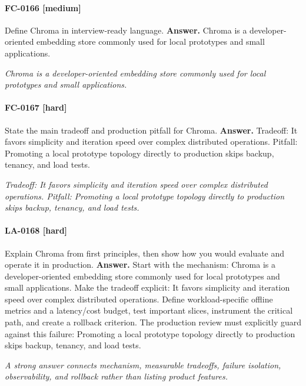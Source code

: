 \paragraph{FC-0166 [medium]} Define Chroma in interview-ready language.
\noindent\textbf{Answer.} Chroma is a developer-oriented embedding store commonly used for local prototypes and small applications.
\par\textit{Chroma is a developer-oriented embedding store commonly used for local prototypes and small applications.}
\paragraph{FC-0167 [hard]} State the main tradeoff and production pitfall for Chroma.
\noindent\textbf{Answer.} Tradeoff: It favors simplicity and iteration speed over complex distributed operations. Pitfall: Promoting a local prototype topology directly to production skips backup, tenancy, and load tests.
\par\textit{Tradeoff: It favors simplicity and iteration speed over complex distributed operations. Pitfall: Promoting a local prototype topology directly to production skips backup, tenancy, and load tests.}
\paragraph{LA-0168 [hard]} Explain Chroma from first principles, then show how you would evaluate and operate it in production.
\noindent\textbf{Answer.} Start with the mechanism: Chroma is a developer-oriented embedding store commonly used for local prototypes and small applications. Make the tradeoff explicit: It favors simplicity and iteration speed over complex distributed operations. Define workload-specific offline metrics and a latency/cost budget, test important slices, instrument the critical path, and create a rollback criterion. The production review must explicitly guard against this failure: Promoting a local prototype topology directly to production skips backup, tenancy, and load tests.
\par\textit{A strong answer connects mechanism, measurable tradeoffs, failure isolation, observability, and rollback rather than listing product features.}
